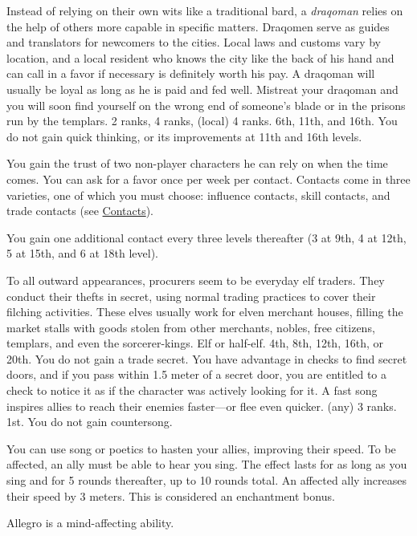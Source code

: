 {Instead of relying on their own wits like a traditional bard, a \emph{draqoman} relies on the help of others more capable in specific matters. Draqomen serve as guides and translators for newcomers to the cities. Local laws and customs vary by location, and a local resident who knows the city like the back of his hand and can call in a favor if necessary is definitely worth his pay. A draqoman will usually be loyal as long as he is paid and fed well. Mistreat your draqoman and you will soon find yourself on the wrong end of someone's blade or in the prisons run by the templars.}
{ 2 ranks,  4 ranks,  (local) 4 ranks.}
{6th, 11th, and 16th.}
{You do not gain quick thinking, or its improvements at 11th and 16th levels.}
{
	You gain the trust of two non-player characters he can rely on when the time comes. You can ask for a favor once per week per contact. Contacts come in three varieties, one of which you must choose: influence contacts, skill contacts, and trade contacts (see \hyperref[sec:contacts]{Contacts}).

	You gain one additional contact every three levels thereafter (3 at 9th, 4 at 12th, 5 at 15th, and 6 at 18th level).
}
{To all outward appearances, procurers seem to be everyday elf traders. They conduct their thefts in secret, using normal trading practices to cover their filching activities. These elves usually work for elven merchant houses, filling the market stalls with goods stolen from other merchants, nobles, free citizens, templars, and even the sorcerer-kings.}
{Elf or half-elf.}
{4th, 8th, 12th, 16th, or 20th.}
{You do not gain a trade secret.}
{
	You have advantage in  checks to find secret doors, and if you pass within 1.5 meter of a secret door, you are entitled to a  check to notice it as if the character was actively looking for it.
}
{A fast song inspires allies to reach their enemies faster---or flee even quicker.}
{ (any) 3 ranks.}
{1st.}
{You do not gain countersong.}
{
	You can use song or poetics to hasten your allies, improving their speed. To be affected, an ally must be able to hear you sing. The effect lasts for as long as you sing and for 5 rounds thereafter, up to 10 rounds total. An affected ally increases their speed by 3 meters. This is considered an enchantment bonus.

	Allegro is a mind-affecting ability.
}

